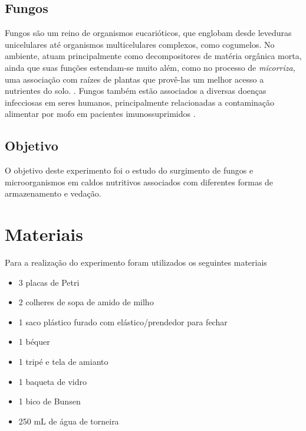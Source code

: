 \documentclass[12pt, titlepage]{article}
\begin{document}
\subsection{Fungos}
Fungos são um reino de organismos eucarióticos, que englobam desde leveduras unicelulares até organismos multicelulares complexos, como cogumelos. No ambiente, atuam principalmente como decompositores de matéria orgânica morta, ainda que suas funções estendam-se muito além, como no processo de \textit{micorriza}, uma associação com raízes de plantas que provê-las um melhor acesso a nutrientes do solo. \cite{buckley2020fungal}. Fungos também estão associados a diversas doenças infecciosas em seres humanos, principalmente relacionadas a contaminação alimentar por mofo em pacientes imunossuprimidos \cite{Benedict2016}.

\subsection{Objetivo}
O objetivo deste experimento foi o estudo do surgimento de fungos e microorganismos em caldos nutritivos associados com diferentes formas de armazenamento e vedação.

\section{Materiais}
Para a realização do experimento foram utilizados os seguintes materiais
\begin{itemize}
	\item 3 placas de Petri
	\item 2 colheres de sopa de amido de milho
	\item 1 saco plástico furado com elástico/prendedor para fechar
	\item 1 béquer
	\item 1 tripé e tela de amianto
	\item 1 baqueta de vidro
	\item 1 bico de Bunsen
	\item 250 mL de água de torneira
\end{itemize}
\end{document}
